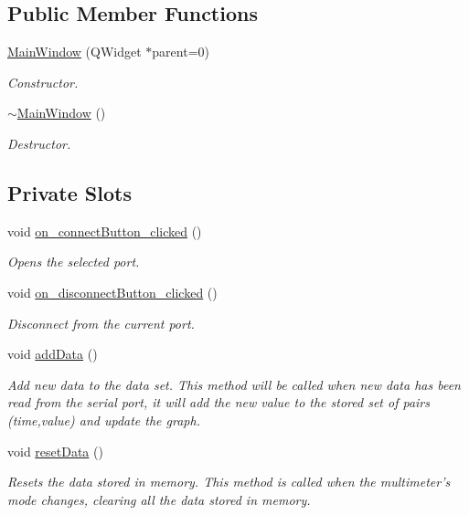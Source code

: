 \subsection*{Public Member Functions}
\begin{DoxyCompactItemize}
\item 
\hyperlink{class_main_window_a8b244be8b7b7db1b08de2a2acb9409db}{Main\-Window} (Q\-Widget $\ast$parent=0)
\begin{DoxyCompactList}\small\item\em Constructor. \end{DoxyCompactList}\item 
\hyperlink{class_main_window_ae98d00a93bc118200eeef9f9bba1dba7}{$\sim$\-Main\-Window} ()
\begin{DoxyCompactList}\small\item\em Destructor. \end{DoxyCompactList}\end{DoxyCompactItemize}
\subsection*{Private Slots}
\begin{DoxyCompactItemize}
\item 
void \hyperlink{class_main_window_a55cd52e7b00aff669290588f8affea5a}{on\-\_\-connect\-Button\-\_\-clicked} ()
\begin{DoxyCompactList}\small\item\em Opens the selected port. \end{DoxyCompactList}\item 
void \hyperlink{class_main_window_ab9336d803a096e94955e032ecf9d0e8b}{on\-\_\-disconnect\-Button\-\_\-clicked} ()
\begin{DoxyCompactList}\small\item\em Disconnect from the current port. \end{DoxyCompactList}\item 
void \hyperlink{class_main_window_a7208eaab614587a945fee7216034aa71}{add\-Data} ()
\begin{DoxyCompactList}\small\item\em Add new data to the data set. This method will be called when new data has been read from the serial port, it will add the new value to the stored set of pairs (time,value) and update the graph. \end{DoxyCompactList}\item 
void \hyperlink{class_main_window_ac9a5649007c5a18e7aa123634866e3a7}{reset\-Data} ()
\begin{DoxyCompactList}\small\item\em Resets the data stored in memory. This method is called when the multimeter's mode changes, clearing all the data stored in memory. \end{DoxyCompactList}\end{DoxyCompactItemize}
